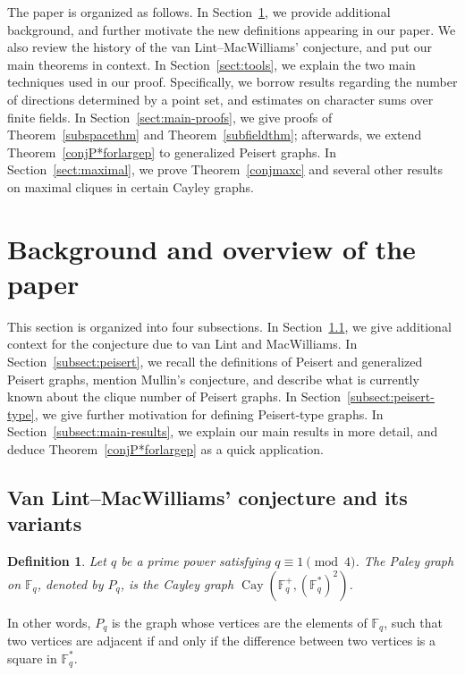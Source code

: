 \documentclass[12pt,reqno]{amsart}
\newtheorem{defn}[thm]{Definition}
\theoremstyle{definition}
\newcommand{\F}{\mathbb{F}}
\begin{document}
The paper is organized as follows. In Section~\ref{sect:background}, we provide additional background, and further motivate the new definitions appearing in our paper. We also review the history of the van Lint--MacWilliams' conjecture, and put our main theorems in context. In Section~\ref{sect:tools}, we explain the two main techniques used in our proof. Specifically, we borrow results regarding the number of directions determined by a point set, and estimates on character sums over finite fields. In Section~\ref{sect:main-proofs}, we give proofs of Theorem~\ref{subspacethm} and Theorem~\ref{subfieldthm}; afterwards, we extend Theorem~\ref{conjP*forlargep} to generalized Peisert graphs. In Section~\ref{sect:maximal}, we prove Theorem~\ref{conjmaxc} and several other results on maximal cliques in certain Cayley graphs. 




\section{Background and overview of the paper}\label{sect:background}

This section is organized into four subsections. In Section~\ref{subsect:history}, we give additional context for the conjecture due to van Lint and MacWilliams. In Section~\ref{subsect:peisert}, we recall the definitions of Peisert and generalized Peisert graphs, mention Mullin's conjecture, and describe what is currently known about the clique number of Peisert graphs. In Section~\ref{subsect:peisert-type}, we give further motivation for defining Peisert-type graphs. In Section~\ref{subsect:main-results}, we explain our main results in more detail, and deduce Theorem~\ref{conjP*forlargep} as a quick application.

\subsection{Van Lint--MacWilliams' conjecture and its variants}\label{subsect:history}

\begin{defn}
Let $q$ be a prime power satisfying $q \equiv 1 \pmod{4}$. The {\em Paley graph} on $\F_q$, denoted by $P_q$, is the Cayley graph $\operatorname{Cay}(\F_q^+,(\F_q^*)^2)$.
\end{defn}

In other words, $P_q$ is the graph whose vertices are the elements of $\F_q$, such that two vertices are adjacent if and only if the difference between two vertices is a square in $\F_q^{\ast}$.
\end{document}
